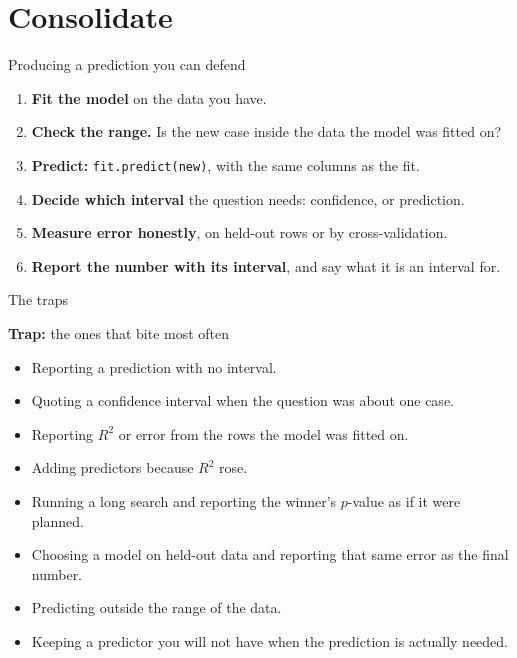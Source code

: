 \documentclass[aspectratio=169]{beamer}
\newenvironment{trap}[1]{\begin{alertblock}{\textbf{Trap:} #1}}{\end{alertblock}}
\begin{document}
\section{Consolidate}
\begin{frame}{Producing a prediction you can defend}
\small
\begin{enumerate}
  \item \textbf{Fit the model} on the data you have.
  \item \textbf{Check the range.} Is the new case inside the data the model was fitted on?
  \item \textbf{Predict:} \texttt{fit.predict(new)}, with the same columns as the fit.
  \item \textbf{Decide which interval} the question needs: confidence, or prediction.
  \item \textbf{Measure error honestly}, on held-out rows or by cross-validation.
  \item \textbf{Report the number with its interval}, and say what it is an interval for.
\end{enumerate}
\end{frame}

\begin{frame}{The traps}
\begin{trap}{the ones that bite most often}
\begin{itemize}
  \item Reporting a prediction with no interval.
  \item Quoting a confidence interval when the question was about one case.
  \item Reporting $R^2$ or error from the rows the model was fitted on.
  \item Adding predictors because $R^2$ rose.
  \item Running a long search and reporting the winner's $p$-value as if it were planned.
  \item Choosing a model on held-out data and reporting that same error as the final number.
  \item Predicting outside the range of the data.
  \item Keeping a predictor you will not have when the prediction is actually needed.
\end{itemize}
\end{trap}
\end{frame}
\end{document}
